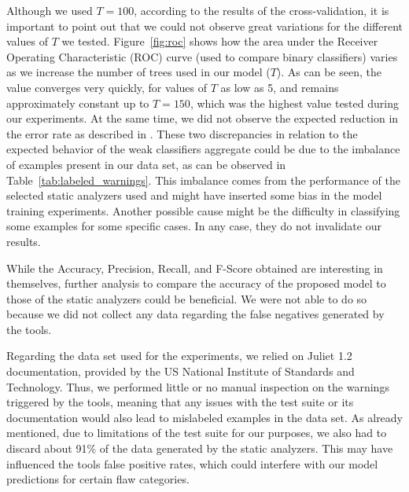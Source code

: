 Although we used $T=100$, according to the results of the cross-validation, it is
important to point out that we could not observe great variations for the
different values of $T$ we tested. Figure~\ref{fig:roc} shows how the area
under the Receiver Operating Characteristic (ROC) curve (used to compare binary
classifiers) varies as we increase the number of trees used in our model ($T$).
As can be seen, the value converges very quickly, for values of $T$ as low as 5, and remains
approximately constant up to $T = 150$, which was the highest value tested
during our experiments. At the same time, we did not observe the expected
reduction in the error rate as described in \cite{freund1999short}.
These two discrepancies in relation to the expected behavior of the weak classifiers aggregate 
could be due to the imbalance of examples present
in our data set, as can be observed in Table~\ref{tab:labeled_warnings}. This
imbalance comes from the performance of the selected static analyzers used and
might have inserted some bias in the model training experiments. Another possible
cause might be
the difficulty in classifying some examples for some specific cases. In
any case, they do not invalidate our results.

While the Accuracy, Precision, Recall, and F-Score obtained are interesting
in themselves, 
further analysis to compare the accuracy of the proposed
model to those of the static analyzers could be beneficial. We were not
able to do so because we did not collect any data
regarding the false negatives generated by the tools.

Regarding the data set used for the experiments, we relied on Juliet
1.2 documentation, provided by the US National Institute of Standards and
Technology. Thus, we performed little or no manual inspection on the warnings
triggered by the tools, meaning that any issues with the test suite or its
documentation would also lead to mislabeled examples in the data set. As
already mentioned, due to
limitations of the test suite for our purposes, we also had to
discard about 91\% of the data generated by the static analyzers. This may have
influenced the tools false positive rates, which could interfere with our model
predictions for certain flaw categories.
